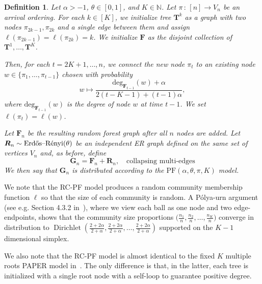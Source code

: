 \documentclass[twoside,11pt]{article}
\newtheorem{defin}[theorem]{Definition}
\theoremstyle{remark}
\begin{document}
\begin{defin}
\label{defin: RC-PF}
Let  $\alpha>-1$, $\theta \in [0, 1]$, and $K \in \mathbb{N}$. Let $\pi \,:\, [n] \rightarrow V_n$ be an arrival ordering. For each $k \in [K]$, we initialize tree $\bm{T}^k$ as a graph with two nodes $\pi_{2k-1}, \pi_{2k}$ and a single edge between them and assign $\ell(\pi_{2k-1})=\ell(\pi_{2k}) = k$. We initialize $\bm{F}$ as the disjoint collection of $\bm{T}^1, \ldots, \bm{T}^K$. 

Then, for each $t = 2K+1, \ldots, n$, we connect the new node $\pi_t$ to an existing node $w \in \{\pi_1,\ldots,\pi_{t-1}\}$ chosen with probability
%
\begin{equation}
\label{defin: attachment rule 2}
w \mapsto \frac{ \mathrm{deg}_{\bm{F}_{t-1}}(w) + \alpha}{2(t-K-1) + (t-1)\alpha},
\end{equation}
where $\mathrm{deg}_{\bm{F}_{t-1}}(w)$ is the degree of node $w$ at time $t-1$. We set $\ell(\pi_t) = \ell(w)$. 

Let $\bm{F}_n$ be the resulting random forest graph after all $n$ nodes are added. Let $\bm{R}_n \sim \text{Erd\H{o}s--R\'
enyi}(\theta)$ be an independent ER graph defined on the same set of vertices $V_n$ and, as before, define
\[
\bm{G}_n = \bm{F}_n + \bm{R}_n, \quad \text{collapsing multi-edges}
\]
We then say that $\bm{G}_n$ is distributed according to the $\mathrm{PF}(\alpha, \theta, \pi, K)$ model. 
\end{defin}

We note that the RC-PF model produces a random community membership function $\ell$ so that the size of each community is random. A P\'olya-urn argument (see e.g. Section 4.3.2 in~\cite{durrett2019probability}), where we view each ball as one node and two edge-endpoints, shows that the community size proportions $\bigl( \frac{n_1}{n}, \frac{n_2}{n}, \ldots, \frac{n_K}{n}\bigr)$ converge in distribution to $\operatorname{Dirichlet}(\frac{2+2\alpha}{2+\alpha}, \frac{2+2\alpha}{2+\alpha}, \ldots, \frac{2+2\alpha}{2+\alpha})$ supported on the $K-1$ dimensional simplex. 

We also note that the RC-PF model is almost identical to the fixed $K$ multiple roots PAPER model in~\cite{crane2024root}. The only difference is that, in the latter, each tree is initialized with a single root node with a self-loop to guarantee positive degree. 
\end{document}
